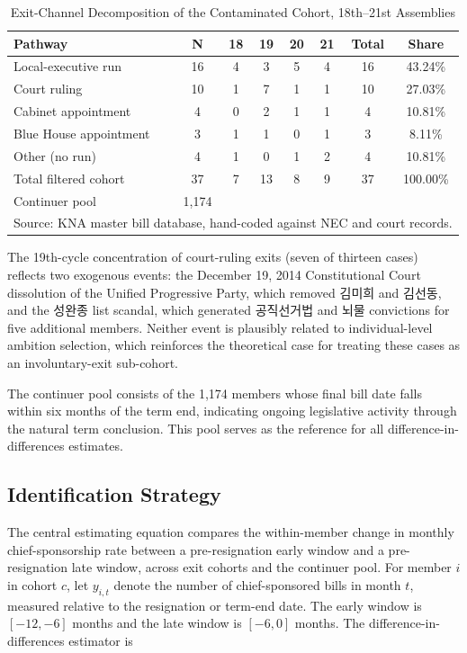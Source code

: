 \documentclass[11pt]{article}
\begin{document}
\begin{table}[H]
\centering
\caption{Exit-Channel Decomposition of the Contaminated Cohort, 18th--21st Assemblies}
\label{tab:desc}
\begin{tabular}{lccccccc}
\toprule
Pathway & N & 18 & 19 & 20 & 21 & Total & Share \\
\midrule
Local-executive run & 16 & 4 & 3 & 5 & 4 & 16 & 43.24\% \\
Court ruling & 10 & 1 & 7 & 1 & 1 & 10 & 27.03\% \\
Cabinet appointment & 4 & 0 & 2 & 1 & 1 & 4 & 10.81\% \\
Blue House appointment & 3 & 1 & 1 & 0 & 1 & 3 & 8.11\% \\
Other (no run) & 4 & 1 & 0 & 1 & 2 & 4 & 10.81\% \\
\midrule
Total filtered cohort & 37 & 7 & 13 & 8 & 9 & 37 & 100.00\% \\
Continuer pool & 1{,}174 & & & & & & \\
\bottomrule
\multicolumn{8}{l}{\footnotesize Source: KNA master bill database, hand-coded against NEC and court records.}
\end{tabular}
\end{table}

The 19th-cycle concentration of court-ruling exits (seven of thirteen cases) reflects two exogenous events: the December 19, 2014 Constitutional Court dissolution of the Unified Progressive Party, which removed 김미희 and 김선동, and the 성완종 list scandal, which generated 공직선거법 and 뇌물 convictions for five additional members. Neither event is plausibly related to individual-level ambition selection, which reinforces the theoretical case for treating these cases as an involuntary-exit sub-cohort.

The continuer pool consists of the 1,174 members whose final bill date falls within six months of the term end, indicating ongoing legislative activity through the natural term conclusion. This pool serves as the reference for all difference-in-differences estimates.

\subsection{Identification Strategy}

The central estimating equation compares the within-member change in monthly chief-sponsorship rate between a pre-resignation early window and a pre-resignation late window, across exit cohorts and the continuer pool. For member $i$ in cohort $c$, let $y_{i,t}$ denote the number of chief-sponsored bills in month $t$, measured relative to the resignation or term-end date. The early window is $[-12, -6]$ months and the late window is $[-6, 0]$ months. The difference-in-differences estimator is
\end{document}
